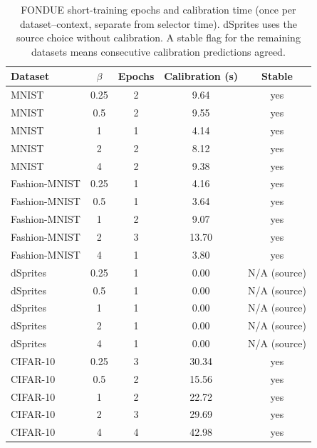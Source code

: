 \begin{table}[H]
\caption{FONDUE short-training epochs and calibration time (once per dataset--context, separate from selector time). dSprites uses the source choice without calibration. A stable flag for the remaining datasets means consecutive calibration predictions agreed.}\label{tab:epochs}
\small
\setlength{\tabcolsep}{3.5pt}
\begin{tabular*}{\textwidth}{@{\extracolsep{\fill}}lcccc@{}}
\toprule
Dataset & $\beta$ & Epochs & Calibration (s) & Stable \\
\midrule
MNIST & 0.25 & 2 & 9.64 & yes \\
MNIST & 0.5 & 2 & 9.55 & yes \\
MNIST & 1 & 1 & 4.14 & yes \\
MNIST & 2 & 2 & 8.12 & yes \\
MNIST & 4 & 2 & 9.38 & yes \\
Fashion-MNIST & 0.25 & 1 & 4.16 & yes \\
Fashion-MNIST & 0.5 & 1 & 3.64 & yes \\
Fashion-MNIST & 1 & 2 & 9.07 & yes \\
Fashion-MNIST & 2 & 3 & 13.70 & yes \\
Fashion-MNIST & 4 & 1 & 3.80 & yes \\
dSprites & 0.25 & 1 & 0.00 & N/A (source) \\
dSprites & 0.5 & 1 & 0.00 & N/A (source) \\
dSprites & 1 & 1 & 0.00 & N/A (source) \\
dSprites & 2 & 1 & 0.00 & N/A (source) \\
dSprites & 4 & 1 & 0.00 & N/A (source) \\
CIFAR-10 & 0.25 & 3 & 30.34 & yes \\
CIFAR-10 & 0.5 & 2 & 15.56 & yes \\
CIFAR-10 & 1 & 2 & 22.72 & yes \\
CIFAR-10 & 2 & 3 & 29.69 & yes \\
CIFAR-10 & 4 & 4 & 42.98 & yes \\
\bottomrule
\end{tabular*}
\end{table}
